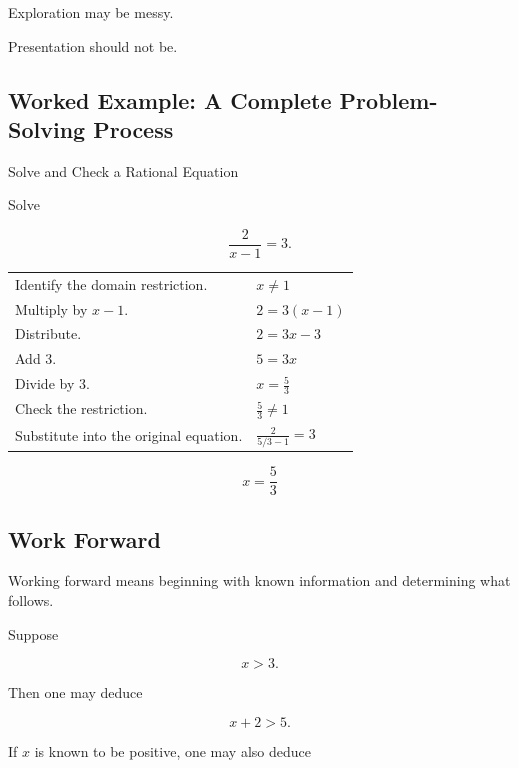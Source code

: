 Exploration may be messy.

Presentation should not be.

\subsection{Worked Example: A Complete Problem-Solving Process}
\label{subsec:worked-complete-problem-solving}

\begin{workedexamplebox}{Solve and Check a Rational Equation}

Solve

\[ \frac{2}{x-1}=3. \]

\begin{tabularx}{\textwidth}{@{}>{\raggedright\arraybackslash}p{}X@{}}
Identify the domain restriction. & \(x\neq1\)\\
Multiply by \(x-1\). & \(2=3(x-1)\)\\
Distribute. & \(2=3x-3\)\\
Add \(3\). & \(5=3x\)\\
Divide by \(3\). & \(x=\frac53\)\\
Check the restriction. & \(\frac53\neq1\)\\
Substitute into the original equation. & \(\frac{2}{5/3-1}=3\)
\end{tabularx}

\begin{answerbox}
\[ x=\frac53 \]
\end{answerbox}
\end{workedexamplebox}

\subsection{Work Forward}
\label{subsec:work-forward}

Working forward means beginning with known information and determining what
follows.

Suppose

\[ x>3. \]

Then one may deduce

\[ x+2>5. \]

If \(x\) is known to be positive, one may also deduce

